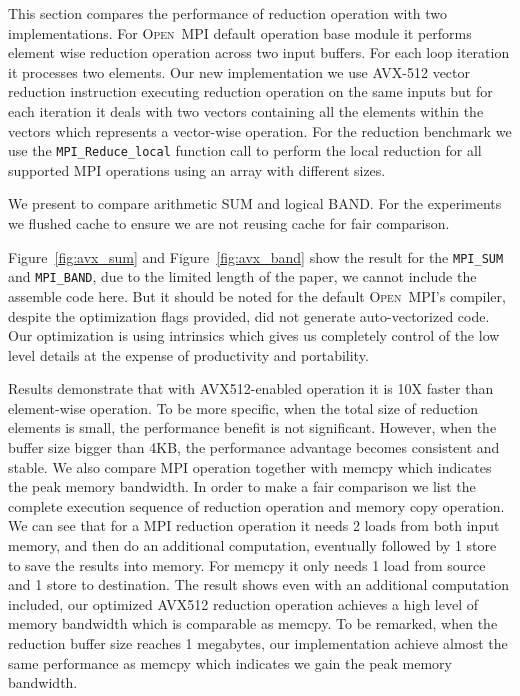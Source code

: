\documentclass[sigconf]{acmart}
\newcommand{\mpifunc}[1]{\lstinline"MPI_#1"\xspace}
\newcommand{\ompi}[0]{\textsc{Open~MPI}\xspace}
\newcommand{\mpi}[0]{\textsc{MPI}\xspace}
\begin{document}
This section compares the performance of reduction operation with two
implementations.
For \ompi default operation base module it
performs element wise reduction operation across two input buffers. For each loop iteration
it processes two elements. Our new implementation we use AVX-512 vector reduction instruction
executing reduction operation on the same inputs but for each iteration it
deals with two vectors containing all the elements within the vectors which represents
a vector-wise operation.
For the reduction benchmark we use the \mpifunc{Reduce_local} function call to
perform the local reduction for all supported MPI operations using an array with different sizes.

We present to compare arithmetic SUM and logical BAND.
For the experiments we flushed cache to ensure we are not reusing cache for fair comparison.

Figure~\ref{fig:avx_sum} and Figure~\ref{fig:avx_band} show the result for the
\mpifunc{SUM} and \mpifunc{BAND}, due to the limited length of the paper, we cannot
include the assemble code here. But it should be noted for the default \ompi's compiler, despite
the optimization flags provided, did not generate auto-vectorized code. Our optimization is
using intrinsics which gives us completely control of the low
level details at the expense of productivity and portability.

Results demonstrate that with AVX512-enabled operation it is 10X faster than element-wise operation.
To be more specific, when the total size of reduction elements is small, the performance benefit is
not significant. However, when the buffer size bigger than 4KB, the performance advantage becomes consistent and stable.
We also compare MPI operation together with memcpy which indicates the peak memory bandwidth.
In order to make a fair comparison we list the complete execution sequence of reduction operation and memory copy operation.
We can see that for a \mpi reduction operation it needs 2 loads from both input memory, and then do an additional computation, eventually followed by 1 store to save the results into memory. For memcpy it only needs 1 load from source and 1 store to destination.
The result shows even with an additional computation included, our optimized AVX512 reduction operation achieves
a high level of memory bandwidth which is comparable as memcpy.
To be remarked, when the reduction buffer size reaches 1 megabytes,
our implementation achieve almost the same performance as memcpy which indicates
we gain the peak memory bandwidth.
\end{document}
